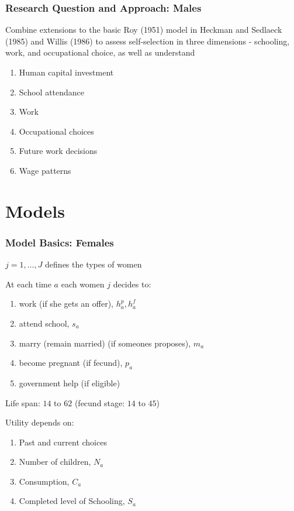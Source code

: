 \begin{frame}
	\frametitle{Research Question and Approach: Males}
		\begin{wideitemize}
			\item Combine extensions to the basic Roy (1951) model in Heckman and Sedlaeck (1985) and Willis (1986) to assess self-selection in three dimensions - schooling, work, and occupational choice, as well as understand
			\begin{enumerate}
				\item Human capital investment
				\item School attendance
				\item Work
				\item Occupational choices
				\item Future work decisions
				\item Wage patterns
			\end{enumerate}			 
		\end{wideitemize}
\end{frame}

\section{Models}
\begin{frame}
	\frametitle{Model Basics: Females}
		\begin{wideitemize}
		\item $j = 1, \ldots, J$ defines the types of women
		\item At each time $a$ each women $j$ decides to:
		\begin{enumerate}
			\item work (if she gets an offer), $h_{a}^p,h_{a}^f$
			\item attend school, $s_{a}$
			\item marry (remain married) (if someones proposes), $m_{a}$
			\item become pregnant (if fecund), $p_{a}$
			\item government help (if eligible)
		\end{enumerate}
		\item Life span: $14$ to $62$ (fecund stage: $14$ to $45$)
		\item Utility depends on:
			\begin{enumerate}
				\item Past and current choices
				\item Number of children, $N_{a}$
				\item Consumption, $C_{a}$
				\item Completed level of Schooling, $S_{a}$
			\end{enumerate}
		\end{wideitemize}
\end{frame}

